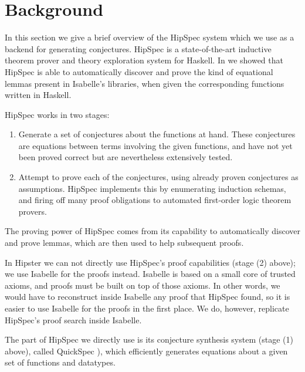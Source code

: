 \section{Background}
\label{sec:background}

In this section we give a brief overview of the HipSpec system which
we use as a backend for generating conjectures. HipSpec is a
state-of-the-art inductive theorem prover and theory exploration
system for Haskell. In \cite{hipspecCADE} we showed that HipSpec is
able to automatically discover and prove the kind of equational lemmas present in
Isabelle's libraries, when given the corresponding functions written in Haskell.

HipSpec works in two stages:
\begin{enumerate}
\item Generate a set of conjectures about the functions at hand. These
  conjectures are equations between terms involving the given
  functions, and have not yet been proved correct but are nevertheless
  extensively tested.

\item Attempt to prove each of the conjectures, using already proven conjectures as assumptions. HipSpec implements this by enumerating induction schemas, and firing off many proof obligations to automated first-order logic theorem provers.
\end{enumerate}
The proving power of HipSpec comes from its capability to
automatically discover and prove lemmas, which are then used to help
subsequent proofs.

In Hipster we can not directly use HipSpec's
proof capabilities (stage (2) above); we use Isabelle for the proofs instead. Isabelle
is based on a small core of trusted axioms, and proofs must be built
on top of those axioms. In other words, we would have to reconstruct
inside Isabelle any proof that HipSpec found, so it is easier
to use Isabelle for the proofs in the first place. We do, however,
replicate HipSpec's proof search inside Isabelle.

The part of HipSpec we directly use
is its conjecture synthesis system (stage (1) above), called QuickSpec \cite{quickspec}),
which efficiently generates equations about a given set of functions and
datatypes.

